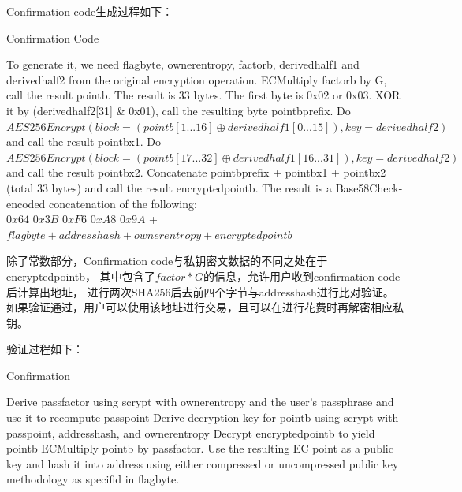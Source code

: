 Confirmation code生成过程如下：

\begin{algorithm}[tbp]\footnotesize
\caption{Confirmation Code}
  	\begin{algorithmic}[1]
	   \STATE To generate it, we need flagbyte, ownerentropy, factorb, derivedhalf1 and 
	   derivedhalf2 from the original encryption operation.
		\STATE ECMultiply factorb by G, call the result pointb. The result is 33 bytes.
		\STATE The first byte is 0x02 or 0x03. XOR it by (derivedhalf2[31] \& 0x01), call 
		the resulting byte pointbprefix.
		\STATE Do $AES256Encrypt(block = (pointb[1...16] \oplus derivedhalf1[0...15]), 
		key = derivedhalf2)$ and call the result pointbx1.
		\STATE Do $AES256Encrypt(block = (pointb[17...32] \oplus derivedhalf1[16...31]),
		 key = derivedhalf2)$ and call the result pointbx2.
		\STATE Concatenate pointbprefix + pointbx1 + pointbx2 (total 33 bytes) 
		and call the result encryptedpointb.  
		\STATE The result is a Base58Check-encoded concatenation of the following: \\ 
		 $0x64$ $0x3B$ $0xF6$ $0xA8$ $0x9A$ + $flagbyte + addresshash + ownerentropy + 
		 encryptedpointb$
    \end{algorithmic}
\end{algorithm}

除了常数部分，Confirmation code与私钥密文数据的不同之处在于encryptedpointb，
其中包含了$factor*G$的信息，允许用户收到confirmation code后计算出地址，
进行两次SHA256后去前四个字节与addresshash进行比对验证。
如果验证通过，用户可以使用该地址进行交易，且可以在进行花费时再解密相应私钥。

验证过程如下：

\begin{algorithm}[tbp]\footnotesize
\caption{Confirmation}
  	\begin{algorithmic}[1]
	   \STATE Derive passfactor using scrypt with ownerentropy and 
	   the user's passphrase and use it to recompute passpoint
		\STATE Derive decryption key for pointb using scrypt with 
		passpoint, addresshash, and ownerentropy
		\STATE Decrypt encryptedpointb to yield pointb
		\STATE ECMultiply pointb by passfactor. Use the resulting 
		EC point as a public key and hash it into address using either 
		compressed or  uncompressed public key methodology as specifid in flagbyte.
    \end{algorithmic}
\end{algorithm}


